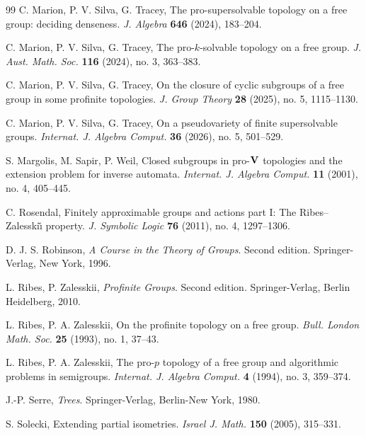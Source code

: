 \documentclass[11pt]{amsart}
\theoremstyle{definition}
\theoremstyle{definition}
\numberwithin{equation}{section}
\begin{document}
\begin{thebibliography}{99}
C. Marion, P. V. Silva, G. Tracey,
The pro-supersolvable topology on a free group: deciding denseness.
\textit{J. Algebra} {\bf 646} (2024), 183--204.

C. Marion, P. V. Silva, G. Tracey,
The pro-$k$-solvable topology on a free group.
\textit{J. Aust. Math. Soc.} {\bf 116} (2024), no. 3, 363--383.

C. Marion, P. V. Silva, G. Tracey,
On the closure of cyclic subgroups of a free group in some profinite topologies.
\textit{J. Group Theory} {\bf 28} (2025), no. 5, 1115--1130.

C. Marion, P. V. Silva, G. Tracey,
On a pseudovariety of finite supersolvable groups.
\textit{Internat. J. Algebra Comput.} {\bf 36} (2026), no. 5, 501--529.


S. Margolis, M. Sapir, P. Weil,
Closed subgroups in pro-${\bf V}$ topologies and the extension problem for inverse automata.
\textit{Internat. J. Algebra Comput.} {\bf 11} (2001), no. 4, 405--445.

C. Rosendal,
Finitely approximable groups and actions part I: The Ribes--Zalesski\v{\i} property. 
\textit{J. Symbolic Logic} {\bf 76} (2011), no. 4, 1297--1306.

D. J. S. Robinson,
\textit{A Course in the Theory of Groups}. Second edition. Springer-Verlag, New York, 1996.

L. Ribes, P. Zalesskii,
\textit{Profinite Groups}. Second edition. Springer-Verlag, Berlin Heidelberg, 2010.

L. Ribes, P. A. Zalesskii, 
On the profinite topology on a free group. \textit{Bull. London Math. Soc.} {\bf 25} (1993), no. 1, 37--43.

L. Ribes, P. A. Zalesskii,
The pro-$p$ topology of a free group and algorithmic problems in semigroups.
\textit{Internat. J. Algebra Comput.} {\bf 4} (1994), no. 3, 359--374.





J.-P. Serre, 
\textit{Trees}.
Springer-Verlag, Berlin-New York, 1980.

S. Solecki,
Extending partial isometries.
\textit{Israel J. Math.} {\bf 150} (2005), 315--331.


\end{thebibliography}
\end{document}
